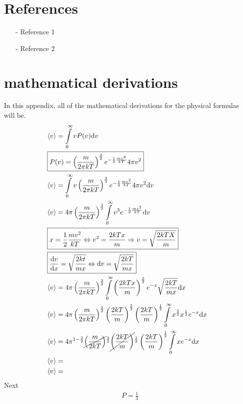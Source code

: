 \documentclass[reprint,english,notitlepage]{revtex4-1}  %
\newcommand{\dd}[1]{\mathrm{d}#1}
\begin{document}
\section*{References}  %
\begin{itemize}
\item[-]Reference 1
\item[-]Reference 2
\end{itemize}

\newpage
\appendix
\section{mathematical derivations}
	In this appendix, all of the mathematical derivations for the physical formulas will be. 
	\begin{eqnarray}
		&\langle v \rangle = \int\limits_0^{\infty} v P(v)\dd{v} \nonumber \\
		&\boxed{P(v) = \left( \frac{m}{2 \pi k T} \right) ^{\frac{3}{2}} e ^{-\frac{1}{2} \frac{mv^2}{kT}}4 \pi v^2} \nonumber\\
		&\langle v \rangle = \int\limits_0^{\infty} v \left( \frac{m}{2 \pi k T} \right) ^{\frac{3}{2}} e^{- \frac{1}{2}\frac{mv^2}{kT}}4 \pi v^2 \dd{v}\nonumber\\
		&\langle v \rangle = 4 \pi\left( \frac{m}{2 \pi k T} \right) ^{\frac{3}{2}}\int\limits_0^{\infty} v^3 e^{-\frac{1}{2}\frac{mv^2}{kT}} \dd{v}\nonumber \\
		&\boxed{x = \frac{1}{2}\frac{mv^2}{kT} \Leftrightarrow v^2= \frac{2kTx}{m} \Rightarrow v=\sqrt{\frac{2kTX}{m}}} \nonumber\\
		&\boxed{\frac{\dd{v}}{\dd{x}}= \sqrt{\frac{2kt}{mx}} \Leftrightarrow \dd{v}= \sqrt{\frac{2kT}{mx}}}\nonumber\\
		&\langle v \rangle = 4 \pi\left( \frac{m}{2 \pi k T} \right) ^{\frac{3}{2}}\int\limits_0^{\infty}\left( \frac{2kTx}{m} \right)^{\frac{3}{2}}e^{-x} \sqrt{\frac{2kT}{mx}} \dd{x}  \nonumber \\
		&\langle v \rangle = 4 \pi\left( \frac{m}{2 \pi k T} \right) ^{\frac{3}{2}} \left( \frac{2kT}{m} \right)^{\frac{3}{2}} \left( \frac{2 kT}{m} \right)^\frac{1}{2}  \int\limits_0^{\infty} x^{\frac{3}{2}}x^{\frac{1}{2}}e^{-x} \dd{x}\nonumber \\
		&\langle v \rangle = 4 \pi^{1-\frac{3}{2}} \cancel{\left(\frac{m}{2kT} \right)}^{\frac{3}{2}} \cancel{\left( \frac{2kT}{m} \right) }^{\frac{3}{2}}
			\left( \frac{2kT}{m} \right) ^{\frac{1}{2}} \int\limits_0^\infty x e^{-x} \dd{x}\nonumber \\
		&\langle v \rangle = \nonumber \\
		&\langle v \rangle = \nonumber 
	\end{eqnarray}
	Next
	\begin{eqnarray}
		&P = \frac{1}{3} 
	\end{eqnarray}
\end{document}
